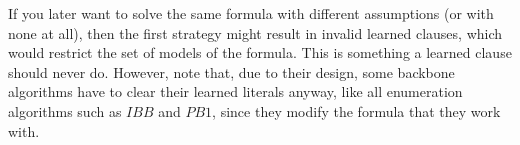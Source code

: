 If you later want to solve the same formula with different assumptions (or with none at all), then the first strategy might result in invalid learned clauses, which would restrict the set of models of the formula. This is something a learned clause should never do. However, note that, due to their design, some backbone algorithms have to clear their learned literals anyway, like all enumeration algorithms such as $IBB$ and $PB1$, since they modify the formula that they work with. 

